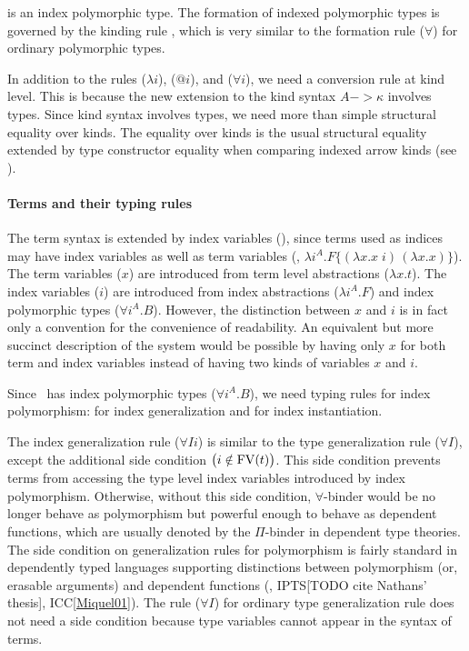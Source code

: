  is an index polymorphic type.
The formation of indexed polymorphic types is governed by
the kinding rule , which is very similar to
the formation rule ($\forall$) for ordinary polymorphic types.

In addition to the rules ($\lambda i$), ($@ i$), and ($\forall i$),
we need a conversion rule  at kind level. This is because
the new extension to the kind syntax $A -> \kappa$ involves types.
Since kind syntax involves types, we need more than simple structural
equality over kinds. The equality over kinds is the usual structural equality
extended by type constructor equality when comparing indexed arrow kinds
(see ).

\paragraph{Terms and their typing rules}
The term syntax is extended by index variables (), since terms used
as indices may have index variables as well as term variables
(\eg, $\lambda i^A.F\{(\lambda x.x\;i)\,(\lambda x.x)\}$).
The term variables ($x$) are introduced from
term level abstractions ($\lambda x.t$).
The index variables ($i$) are introduced from
index abstractions ($\lambda i^A.F$) and
index polymorphic types ($\forall i^A.B$). However, the distinction between
$x$ and $i$ is in fact only a convention for the convenience of readability.
An equivalent but more succinct description of the system would be possible
by having only $x$ for both term and index variables instead of having two
kinds of variables $x$ and $i$.

Since \Fi\ has index polymorphic types ($\forall i^A . B$),
we need typing rules for index polymorphism:
 for index generalization
and  for index instantiation.

The index generalization rule ($\forall I i$) is similar to
the type generalization rule ($\forall I$), except the additional
side condition $\big(i\notin\mathop{\mathrm{FV}}(t)\big)$. This side condition prevents
terms from accessing the type level index variables introduced by index
polymorphism. Otherwise, without this side condition, $\forall$-binder
would be no longer behave as polymorphism but powerful enough to behave as
dependent functions, which are usually denoted by the $\Pi$-binder in
dependent type theories. The side condition on generalization rules
for polymorphism is fairly standard in dependently typed languages supporting
distinctions between polymorphism (or, erasable arguments) and
dependent functions (\eg, IPTS[TODO cite Nathans' thesis], ICC\ref{Miquel01}).
The rule ($\forall I$) for ordinary type generalization rule does not need
a side condition because type variables cannot appear in the syntax of terms.

